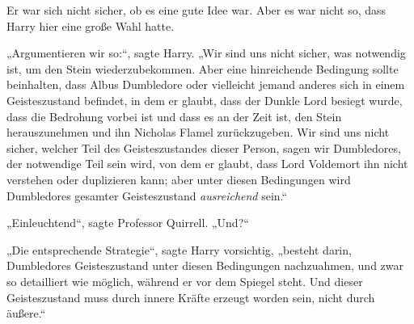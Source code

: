 Er war sich nicht sicher, ob es eine gute Idee war. Aber es war nicht so, dass Harry hier eine große Wahl hatte.

„Argumentieren wir so:“, sagte Harry.
„Wir sind uns nicht sicher, was notwendig ist, um den Stein wiederzubekommen. Aber eine hinreichende Bedingung sollte beinhalten, dass Albus Dumbledore oder vielleicht jemand anderes sich in einem Geisteszustand befindet, in dem er glaubt, dass der Dunkle Lord besiegt wurde, dass die Bedrohung vorbei ist und dass es an der Zeit ist, den Stein herauszunehmen und ihn Nicholas Flamel zurückzugeben. Wir sind uns nicht sicher, welcher Teil des Geisteszustandes dieser Person, sagen wir Dumbledores, der notwendige Teil sein wird, von dem er glaubt, dass Lord Voldemort ihn nicht verstehen oder duplizieren kann; aber unter diesen Bedingungen wird Dumbledores gesamter Geisteszustand \emph{ausreichend} sein.“

„Einleuchtend“, sagte Professor Quirrell.
„Und?“

„Die entsprechende Strategie“, sagte Harry vorsichtig, „besteht darin, Dumbledores Geisteszustand unter diesen Bedingungen nachzuahmen, und zwar so detailliert wie möglich, während er vor dem Spiegel steht. Und dieser Geisteszustand muss durch innere Kräfte erzeugt worden sein, nicht durch äußere.“

